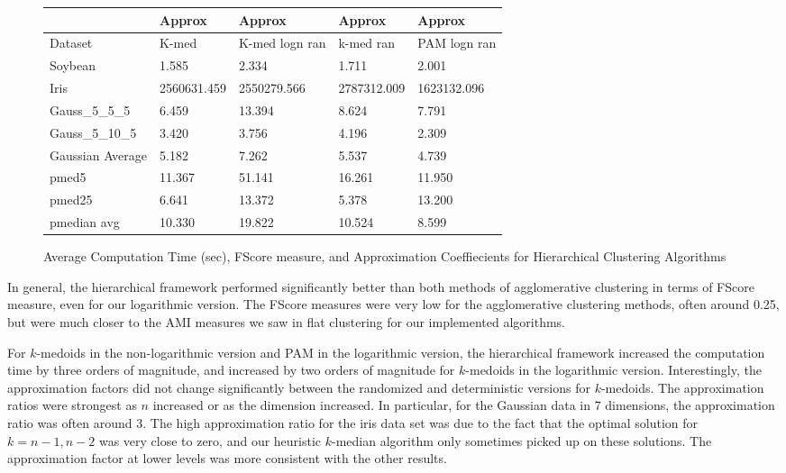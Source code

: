 \documentclass{article}
\begin{document}
\begin{figure*}[h]
\begin{tabular}{ | l | l | l | l | l | }
\hline
	   & Approx & Approx & Approx & Approx \\ \hline
	Dataset & K-med & K-med logn ran & k-med ran & PAM logn ran \\ \hline
	Soybean & 1.585 & 2.334 & 1.711 & 2.001 \\ 
	Iris & 2560631.459 & 2550279.566 & 2787312.009 & 1623132.096 \\ 
	Gauss\_5\_5\_5 & 6.459 & 13.394 & 8.624 & 7.791 \\
	Gauss\_5\_10\_5 &  3.420 & 3.756 & 4.196 & 2.309  \\
	Gaussian Average & 5.182 & 7.262  & 5.537 & 4.739 \\ 
	pmed5 & 11.367 & 51.141 & 16.261 & 11.950 \\ 
	pmed25 & 6.641 & 13.372 & 5.378 & 13.200 \\ 
	pmedian avg & 10.330 & 19.822 & 10.524 & 8.599 \\ \hline
\end{tabular}

\caption{Average Computation Time (sec), FScore measure, and Approximation Coeffiecients for Hierarchical Clustering Algorithms}
\end{figure*}

In general, the hierarchical framework performed significantly better than both methods of agglomerative clustering in terms of FScore measure, even for our logarithmic version. The FScore measures were very low for the agglomerative clustering methods, often around 0.25, but were much closer to the AMI measures we saw in flat clustering for our implemented algorithms. 

For $k$-medoids in the non-logarithmic version and PAM in the logarithmic version, the hierarchical framework increased the computation time by three orders of magnitude, and increased by two orders of magnitude for $k$-medoids in the logarithmic version. Interestingly, the approximation factors did not change significantly between the randomized and deterministic versions for $k$-medoids. The approximation ratios were strongest as $n$ increased or as the dimension increased. In particular, for the Gaussian data in 7 dimensions, the approximation ratio was often around 3.  The high approximation ratio for the iris data set was due to the fact that the optimal solution for $k = n-1, n-2$ was very close to zero, and our heuristic $k$-median algorithm only sometimes picked up on these solutions. The approximation factor at lower levels was more consistent with the other results. 
\end{document}

